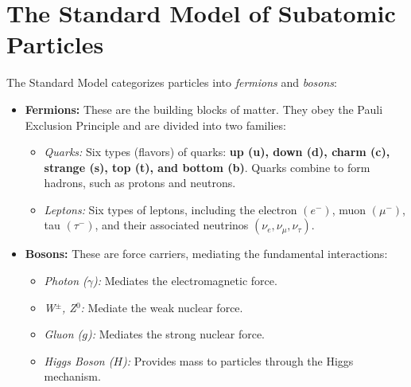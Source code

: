 \section{The Standard Model of Subatomic Particles}
The Standard Model categorizes particles into \textit{fermions} and \textit{bosons}:
\begin{itemize}
    \item \textbf{Fermions:} These are the building blocks of matter. They obey the Pauli Exclusion Principle and are divided into two families:
    \begin{itemize}
        \item \textit{Quarks:} Six types (flavors) of quarks: \textbf{up (u), down (d), charm (c), strange (s), top (t), and bottom (b)}. Quarks combine to form hadrons, such as protons and neutrons.
        \item \textit{Leptons:} Six types of leptons, including the electron $(e^-)$, muon $(\mu^-)$, tau $(\tau^-)$, and their associated neutrinos $(\nu_e, \nu_\mu, \nu_\tau)$.
    \end{itemize}
    \item \textbf{Bosons:} These are force carriers, mediating the fundamental interactions:
    \begin{itemize}
        \item \textit{Photon ($\gamma$):} Mediates the electromagnetic force.
        \item \textit{W$^\pm$, Z$^0$:} Mediate the weak nuclear force.
        \item \textit{Gluon ($g$):} Mediates the strong nuclear force.
        \item \textit{Higgs Boson ($H$):} Provides mass to particles through the Higgs mechanism.
    \end{itemize}
\end{itemize}

